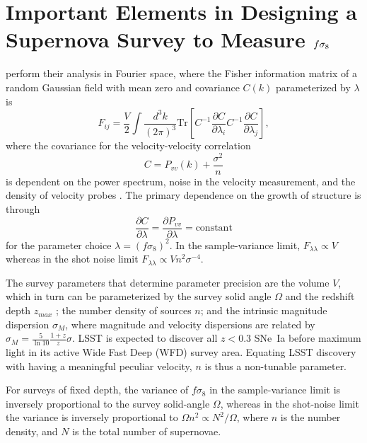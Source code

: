 \documentclass{aastex62}   	%
\begin{document}
\section{Important Elements in Designing a Supernova Survey to Measure $\MakeLowercase{f}\sigma_8$}
\citet{2017ApJ...847..128H} perform their analysis in Fourier space, 
where the Fisher information matrix of a random Gaussian field with mean zero and covariance $C(k)$ parameterized by $\lambda$ is
\begin{equation}
F_{ij} = \frac{V}{2}\int \frac{d^3k}{(2\pi)^3} \text{Tr}\left[ C^{-1} \frac{\partial C}{\partial \lambda_i} C^{-1}
\frac{\partial C}{\partial \lambda_j} \right],
\end{equation}
where the covariance for the velocity-velocity correlation
\begin{equation}
C = P_{vv}(k) + \frac{\sigma^2}{n}
\label{cov:eq}
\end{equation}
is dependent on the power spectrum, noise in the velocity measurement, and the density of velocity probes
\citep{2017MNRAS.464.2517H}.  
The primary dependence on the growth of structure is through
\begin{equation}
\frac{\partial C}{\partial \lambda} = \frac{\partial P_{vv}}{\partial \lambda} = \text{constant}
\end{equation}
for the parameter choice
$\lambda=(f\sigma_8)^2$.  In the sample-variance limit, $F_{\lambda \lambda} \propto V$ whereas in the shot noise limit $F_{\lambda \lambda} \propto V n^2 \sigma^{-4}$.


The survey parameters that determine parameter precision are the volume $V$, which
in turn can be parameterized by the survey solid angle $\Omega$ and the redshift depth $z_{max}$ ; the number density of sources $n$; and the intrinsic
magnitude dispersion $\sigma_M$, where magnitude and velocity dispersions are related by $\sigma_{M} = \frac{5}{\ln{10}} \frac{1+z}{z} \sigma$.
LSST is expected to discover all $z<0.3$ SNe~Ia before maximum light in its active Wide Fast Deep (WFD) survey area.
Equating LSST discovery with having a meaningful peculiar velocity, $n$ is thus a non-tunable parameter.




For surveys of fixed depth, the variance of $f\sigma_8$ 
in the sample-variance limit  
is inversely proportional to the survey solid-angle $\Omega$, whereas
in the shot-noise limit the variance is inversely proportional to $\Omega n^2 \propto N^2/\Omega$, where $n$ is the number density,
and $N$ is the total number of supernovae.  
\end{document}
